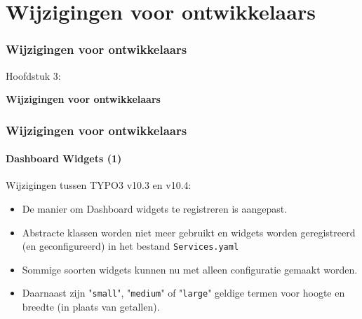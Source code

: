 %

\section{Wijzigingen voor ontwikkelaars}
\begin{frame}[fragile]
	\frametitle{Wijzigingen voor ontwikkelaars}

	\begin{center}\huge{Hoofdstuk 3:}\end{center}
	\begin{center}\huge{\color{typo3darkgrey}\textbf{Wijzigingen voor ontwikkelaars}}\end{center}

\end{frame}


\begin{frame}[fragile]
	\frametitle{Wijzigingen voor ontwikkelaars}
	\framesubtitle{Dashboard Widgets (1)}

	Wijzigingen tussen TYPO3 v10.3 en v10.4:

	\begin{itemize}
		\item De manier om Dashboard widgets te registreren is aangepast.
		\item Abstracte klassen worden niet meer gebruikt en widgets worden geregistreerd
			(en geconfigureerd) in het bestand \texttt{Services.yaml}
		\item Sommige soorten widgets kunnen nu met alleen configuratie gemaakt worden.
		\item Daarnaast zijn "\texttt{small}", "\texttt{medium}" of "\texttt{large}"
			geldige termen voor hoogte en breedte (in plaats van getallen).
	\end{itemize}

\end{frame}



